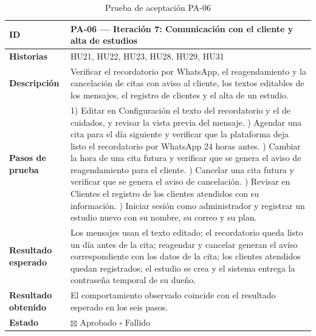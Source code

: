 \documentclass[12pt,letterpaper,oneside]{report}
\begin{document}
\begin{table}[H]
  \centering
  \caption{Prueba de aceptación PA-06}
  \label{tab:pa06anexo}
  \renewcommand{\arraystretch}{1.3}
  \small
  \begin{tabular}{|>{\raggedright\arraybackslash}p{3.6cm}|p{9.4cm}|}
    \hline
    \textbf{ID} & PA-06 — Iteración 7: Comunicación con el cliente y alta de estudios \\ \hline
    \textbf{Historias} & HU21, HU22, HU23, HU28, HU29, HU31 \\ \hline
    \textbf{Descripción} & Verificar el recordatorio por WhatsApp, el reagendamiento y la cancelación de citas con aviso al cliente, los textos editables de los mensajes, el registro de clientes y el alta de un estudio. \\ \hline
    \textbf{Pasos de prueba} &
      1) Editar en Configuración el texto del recordatorio y el de cuidados, y revisar la vista previa del mensaje. \newline
      2) Agendar una cita para el día siguiente y verificar que la plataforma deja listo el recordatorio por WhatsApp 24 horas antes. \newline
      3) Cambiar la hora de una cita futura y verificar que se genera el aviso de reagendamiento para el cliente. \newline
      4) Cancelar una cita futura y verificar que se genera el aviso de cancelación. \newline
      5) Revisar en Clientes el registro de los clientes atendidos con su información. \newline
      6) Iniciar sesión como administrador y registrar un estudio nuevo con su nombre, su correo y su plan. \\ \hline
    \textbf{Resultado esperado} & Los mensajes usan el texto editado; el recordatorio queda listo un día antes de la cita; reagendar y cancelar generan el aviso correspondiente con los datos de la cita; los clientes atendidos quedan registrados; el estudio se crea y el sistema entrega la contraseña temporal de su dueño. \\ \hline
    \textbf{Resultado obtenido} & El comportamiento observado coincide con el resultado esperado en los seis pasos. \\ \hline
    \textbf{Estado} & $\boxtimes$ Aprobado \qquad $\square$ Fallido \\ \hline
  \end{tabular}
\end{table}
\end{document}
